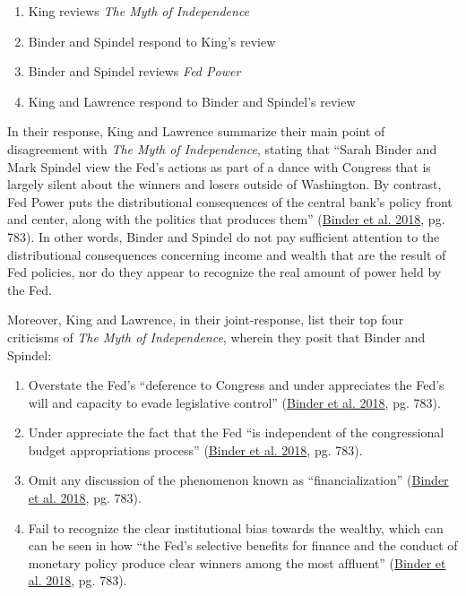 \documentclass[
  12pt,
]{article}
\providecommand{\tightlist}{%
  \setlength{\itemsep}{0pt}\setlength{\parskip}{0pt}}
\begin{document}
\begin{enumerate}
\def\labelenumi{\arabic{enumi}.}
\tightlist
\item
  King reviews \emph{The Myth of Independence}
\item
  Binder and Spindel respond to King's review
\item
  Binder and Spindel reviews \emph{Fed Power}
\item
  King and Lawrence respond to Binder and Spindel's review
\end{enumerate}

In their response, King and Lawrence summarize their main point of
disagreement with \emph{The Myth of Independence}, stating that ``Sarah
Binder and Mark Spindel view the Fed's actions as part of a dance with
Congress that is largely silent about the winners and losers outside of
Washington. By contrast, Fed Power puts the distributional consequences
of the central bank's policy front and center, along with the politics
that produces them'' (\protect\hyperlink{ref-binder2018c}{Binder et al.
2018}, pg. 783). In other words, Binder and Spindel do not pay
sufficient attention to the distributional consequences concerning
income and wealth that are the result of Fed policies, nor do they
appear to recognize the real amount of power held by the Fed.

Moreover, King and Lawrence, in their joint-response, list their top
four criticisms of \emph{The Myth of Independence}, wherein they posit
that Binder and Spindel:

\begin{enumerate}
\def\labelenumi{\arabic{enumi}.}
\tightlist
\item
  Overstate the Fed's ``deference to Congress and under appreciates the
  Fed's will and capacity to evade legislative control''
  (\protect\hyperlink{ref-binder2018c}{Binder et al. 2018}, pg. 783).
\item
  Under appreciate the fact that the Fed ``is independent of the
  congressional budget appropriations process''
  (\protect\hyperlink{ref-binder2018c}{Binder et al. 2018}, pg. 783).
\item
  Omit any discussion of the phenomenon known as ``financialization''
  (\protect\hyperlink{ref-binder2018c}{Binder et al. 2018}, pg. 783).
\item
  Fail to recognize the clear institutional bias towards the wealthy,
  which can can be seen in how ``the Fed's selective beneﬁts for ﬁnance
  and the conduct of monetary policy produce clear winners among the
  most afﬂuent'' (\protect\hyperlink{ref-binder2018c}{Binder et al.
  2018}, pg. 783).
\end{enumerate}
\end{document}
